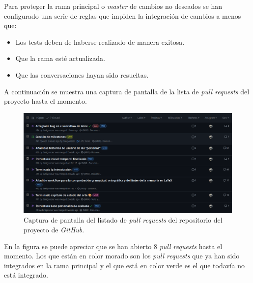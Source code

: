 Para proteger la rama principal o \textit{master} de cambios no deseados se han configurado una serie de reglas que impiden la integración de cambios a menos que:

\begin{itemize}
    \item Los tests deben de haberse realizado de manera exitosa.
    \item Que la rama esté actualizada.
    \item Que las conversaciones hayan sido resueltas.
\end{itemize}

A continuación se muestra una captura de pantalla de la lista de \textit{pull requests} del proyecto hasta el momento.

\begin{figure}[H]
    \caption{Captura de pantalla del listado de \textit{pull requests} del repositorio del proyecto de \textit{GitHub}.}
    \centering
    \vspace*{0.5cm}
    \includegraphics[scale=0.2]{figuras/listado_pull_requests_github.png}
\end{figure}

En la figura se puede apreciar que se han abierto 8 \textit{pull requests} hasta el momento. Los que están en color morado son los \textit{pull requests} que ya han sido integrados en la rama principal y el que está en color verde es el que todavía no está integrado.


